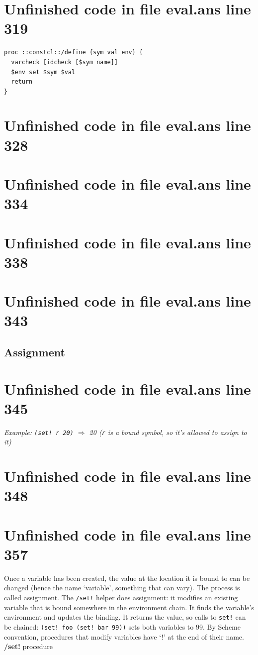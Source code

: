 \documentclass[twoside,9pt]{report}
\begin{document}
\section{Unfinished code in file eval.ans line 319}
\begin{lstlisting}
proc ::constcl::/define {sym val env} {
  varcheck [idcheck [$sym name]]
  $env set $sym $val
  return
}
\end{lstlisting}
\section{Unfinished code in file eval.ans line 328}
\section{Unfinished code in file eval.ans line 334}
\section{Unfinished code in file eval.ans line 338}
\section{Unfinished code in file eval.ans line 343}
\subsection{Assignment}
\label{assignment}
\section{Unfinished code in file eval.ans line 345}


\emph{Example: \texttt{(set! r 20)} $\Rightarrow$ 20 (\texttt{r} is a bound symbol, so it's allowed to assign to it)}

\section{Unfinished code in file eval.ans line 348}
\section{Unfinished code in file eval.ans line 357}

Once a variable has been created, the value at the location it is bound to can be changed (hence the name `variable', something that can vary). The process is called assignment. The \texttt{/set!} helper does assignment: it modifies an existing variable that is bound somewhere in the environment chain. It finds the variable's environment and updates the binding. It returns the value, so calls to \texttt{set!} can be chained: \texttt{(set! foo (set! bar 99))} sets both variables to 99. By Scheme convention, procedures that modify variables have `!' at the end of their name. \textbf{/set!} procedure
\end{document}
